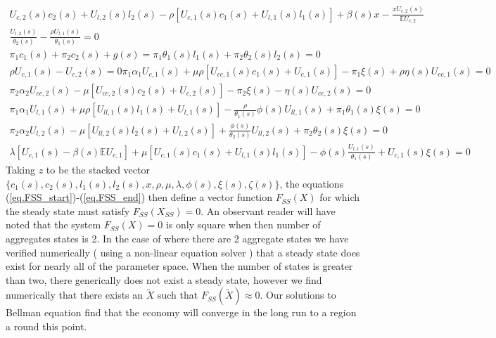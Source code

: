 \documentclass[thmsb,11pt]{article}
\begin{document}
\begin{subequations}
\begin{align}
	U_{c,2}(s)c_2(s)+U_{l,2}(s)l_2(s) - \rho\left[U_{c,1}(s)c_1(s)+U_{l,1}(s)l_1(s)\right]+\beta(s)x -\frac{x U_{c,2}(s)}{\mathbb E U_{c,2}}\label{eq.FSS_start}\\
	\frac{U_{l,2}(s)}{\theta_2(s)} - \frac{\rho U_{l,1}(s)}{\theta_1(s)}=0\\
	\pi_1 c_1(s)+\pi_2 c_2(s)+g(s) = \pi_1 \theta_1(s) l_1(s) + \pi_2\theta_2(s) l_2(s)=0\\
	\rho U_{c,1}(s)-U_{c,2}(s) =0
	\pi_1\alpha_1 U_{c,1}(s) + \mu\rho\left[ U_{cc,1}(s) c_1(s)+U_{c,1}(s)\right] -\pi_1\xi(s)  + \rho\eta(s)U_{cc,1}(s) = 0\\
	\pi_2\alpha_2 U_{cc,2}(s) - \mu\left[ U_{cc,2}(s)c_2(s)+U_{c,2}(s)\right] - \pi_2\xi(s) -\eta(s) U_{cc,2}(s) = 0\\
	\pi_1 \alpha_1 U_{l,1}(s) +\mu\rho\left[U_{ll,1}(s) l_1(s) + U_{l,1}(s)\right] - \frac\rho{\theta_1(s)}\phi(s) U_{ll,1}(s) + \pi_1\theta_1(s)\xi(s) = 0\\
	\pi_2\alpha_2 U_{l,2}(s)  -\mu\left[U_{ll,2}(s)l_2(s) + U_{l,2}(s)\right] +\frac{\phi(s)}{\theta_2(s)} U_{ll,2}(s) + \pi_2\theta_2(s)\xi(s) = 0\\
	\lambda\left[U_{c,1}(s)-\beta(s)\mathbb E U_{c,1}\right] + \mu\left[ U_{c,1}(s)c_1(s) + U_{l,1}(s) l_1(s)\right] - \phi(s)\frac{U_{l,1}(s)}{\theta_1(s)} + U_{c,1}(s)\xi(s) = 0\label{eq.FSS_end}
\end{align}\end{subequations}  Taking $z$ to be the stacked vector $\{c_1(s),c_2(s),l_1(s),l_2(s),x,\rho,\mu,\lambda,\phi(s),\xi(s),\zeta(s)\}$, the equations (\ref{eq.FSS_start})-(\ref{eq.FSS_end}) then define a vector function $F_{SS}(X)$ for which the steady state must satisfy $F_{SS}(X_{SS}) = 0$.  An observant reader will have noted that the system $F_{SS}(X) = 0$ is only square when then number of aggregates states is 2.   In the case of where there are 2 aggregate states we have verified numerically ( using a non-linear equation solver ) that a steady state does exist for nearly all of the parameter space.  When the number of states is greater than two, there generically does not exist a steady state, however we find numerically that there exists an $\tilde X$ such that $F_{SS}(\tilde X) \approx 0$.  Our solutions to Bellman equation find that the economy will converge in the long run to a region a round this point.
\end{document}
